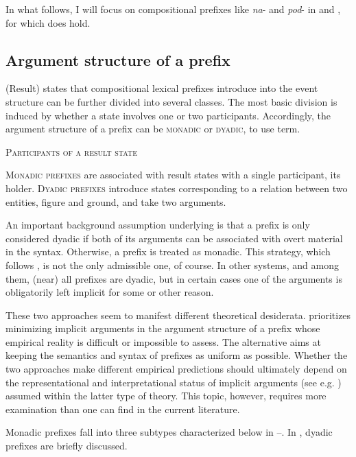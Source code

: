 \documentclass[output=paper,colorlinks,citecolor=brown]{langscibook}
\begin{document}
In what follows, I will focus on compositional prefixes like \textit{na}- and \textit{pod}- in  and , for which  does hold.

\subsection{Argument structure of a prefix}
\label{sec:3.3}
\hypertarget{RefHeadingToc164647627}{}
(Result) states that compositional lexical prefixes introduce into the event structure can be further divided into several classes. The most basic division is induced by whether a state involves one or two participants. Accordingly, the argument structure of a prefix can be \textsc{monadic} or \textsc{dyadic}, to use  term.

\eanoraggedright   \textsc{Participants of a result state}\label{ex:tatevosov:74}

\textsc{Monadic prefixes} are associated with result states with a single participant, its holder. \textsc{Dyadic prefixes} introduce states corresponding to a relation between two entities, figure and ground, and take two arguments.  
\z

\noindent An important background assumption underlying  is that a prefix is only considered dyadic if both of its arguments can be associated with overt material in the syntax. Otherwise, a prefix is treated as monadic. This strategy, which follows \citet{Romanova2007}, is not the only admissible one, of course. In other systems, \citet{BabkoMalaya1999} and \citet{Biskup2019} among them, (near) all prefixes are dyadic, but in certain cases one of the arguments is obligatorily left implicit for some or other reason.

These two approaches seem to manifest different theoretical desiderata.  prioritizes minimizing implicit arguments in the argument structure of a prefix whose empirical reality is difficult or impossible to assess. The alternative aims at keeping the semantics and syntax of prefixes as uniform as possible. Whether the two approaches make different empirical predictions should ultimately depend on the representational and interpretational status of implicit arguments (see e.g. \citealt{Landau2010,Bhatt.Pancheva2017}) assumed within the latter type of theory. This topic, however, requires more examination than one can find in the current literature.

Monadic prefixes fall into three subtypes characterized below in --. In , dyadic prefixes are briefly discussed.
\end{document}
